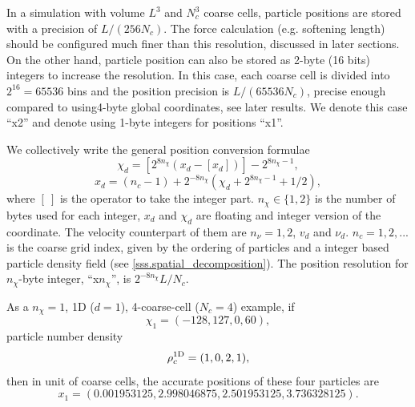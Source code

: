 \documentclass[10pt,twocolumn,preprint]{emulateapj}
\begin{document}
In a simulation with volume $L^3$ and $N_c^3$ coarse cells, particle positions are stored with a precision of $L/(256N_c)$. The force calculation (e.g. softening length) should be configured much finer than this resolution, discussed in later sections. On the other hand, particle position can also be stored as 2-byte (16 bits) integers to increase the resolution. In this case, each coarse cell is divided into $2^{16}=65536$ bins and the position precision is $L/(65536N_c)$, precise enough compared to using4-byte global coordinates, see later results. We denote this case ``x2'' and denote using 1-byte integers for positions ``x1''.

We collectively write the general position conversion formulae
\begin{equation}\label{eq.chi}
	\chi_d=\left[2^{8n_\chi}(x_d-\left[x_d\right])\right]-2^{8n_\chi-1},
\end{equation}
\begin{equation}\label{eq.x}
	x_d=(n_c-1)+2^{-8n_\chi}\left(\chi_d+2^{8n_\chi-1}+1/2\right),
\end{equation}
where $[\ ]$ is the operator to take the integer part. $n_\chi\in\{1,2\}$ is the number of bytes used for each integer, $x_d$ and $\chi_d$ are floating and integer version of the coordinate. The velocity counterpart of them are $n_\nu=1,2$, $v_d$ and $\nu_d$. $n_c=1,2,...$ is the coarse grid index, given by the ordering of particles and a integer based particle density field (see \ref{sss.spatial_decomposition}). The position resolution for $n_\chi$-byte integer, ``x$n_\chi$'', is $2^{-8n_\chi}L/N_c$.

As a $n_\chi=1$, 1D ($d=1$), 4-coarse-cell ($N_c=4$) example, if $$\chi_1=(-128,127,0,60),$$ particle number density $${\rho_c^{\rm 1D}}=(1,0,2,1),$$ then in unit of coarse cells, the accurate positions of these four particles are $$x_1=(0.001953125, 2.998046875, 2.501953125, 3.736328125).$$
\end{document}
